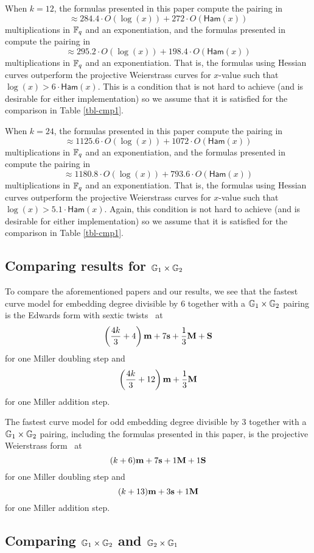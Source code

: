 When $k=12$, the formulas presented in this paper compute the pairing in
$$\approx 284.4 \cdot O(\log(x)) + 272 \cdot O(\mathsf{Ham}(x))$$
multiplications in $\mathbb{F}_{q}$ and an exponentiation,
and the formulas presented in~\cite{2009/craig} compute the pairing in
$$\approx 295.2 \cdot O(\log(x)) + 198.4 \cdot O(\mathsf{Ham}(x))$$
multiplications in $\mathbb{F}_{q}$ and an exponentiation.
That is, the formulas using Hessian curves outperform the projective Weierstrass curves for $x$-value such that $\log(x) > 6 \cdot \mathsf{Ham}(x)$.
This is a condition that is not hard to achieve (and is desirable for either implementation) so we assume that it is satisfied for the comparison in Table \ref{tbl-cmp1}.

When $k = 24$, the formulas presented in this paper compute the pairing in
$$\approx 1125.6 \cdot O(\log(x)) + 1072 \cdot O(\mathsf{Ham}(x))$$
multiplications in $\mathbb{F}_{q}$ and an exponentiation,
and the formulas presented in~\cite{2009/craig} compute the pairing in
$$\approx 1180.8 \cdot O(\log(x)) + 793.6 \cdot O(\mathsf{Ham}(x))$$
multiplications in $\mathbb{F}_{q}$ and an exponentiation.
That is, the formulas using Hessian curves outperform the projective Weierstrass curves for $x$-value such that $\log(x) > 5.1 \cdot \mathsf{Ham}(x)$.
Again, this condition is not hard to achieve (and is desirable for either implementation) so we assume that it is satisfied for the comparison in Table \ref{tbl-cmp1}.

\subsection{Comparing results for $\mathbb{G}_{1} \times \mathbb{G}_{2}$}

To compare the aforementioned papers and our results, we see that
the fastest curve model for embedding degree divisible by 6 together with a $\mathbb{G}_{1} \times \mathbb{G}_{2}$ pairing
is the Edwards form with sextic twists~\cite{2014/LWZ}
at
$$\left(\frac{4k}{3}+ 4\right)\textbf{m} + 7\textbf{s}  + \frac{1}{3}\textbf{M} + \textbf{S}$$
for one Miller doubling step and
$$\left(\frac{4k}{3} + 12\right)\textbf{m}  + \frac{1}{3}\textbf{M}$$
for one Miller addition step.

The fastest curve model for odd embedding degree divisible by 3 together with a $\mathbb{G}_{1} \times \mathbb{G}_{2}$ pairing, including the formulas presented in this paper,
is the projective Weierstrass form~\cite{2009/craig}
at
$$(k+6)\textbf{m} + 7\textbf{s} + 1\textbf{M} + 1\textbf{S}$$
for one Miller doubling step and
$$(k+13)\textbf{m} + 3\textbf{s} + 1\textbf{M}$$
for one Miller addition step.

\subsection{Comparing $\mathbb{G}_{1} \times \mathbb{G}_{2}$ and $\mathbb{G}_{2} \times \mathbb{G}_{1}$}

